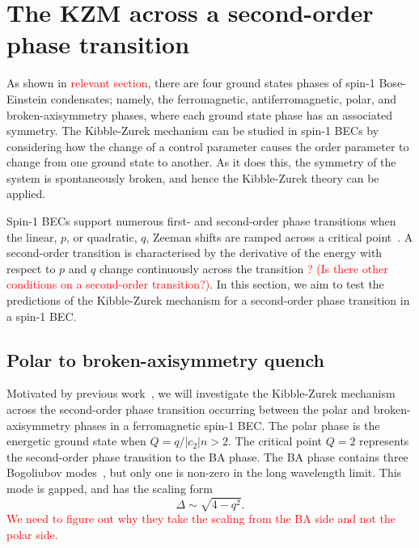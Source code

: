 \section{The KZM across a second-order phase transition}
As shown in \textcolor{red}{relevant section}, there are four ground states
phases of spin-1 Bose-Einstein condensates; namely, the ferromagnetic,
antiferromagnetic, polar, and broken-axisymmetry phases, where each ground
state phase has an associated symmetry.
The Kibble-Zurek mechanism can be studied in spin-1 BECs by considering how
the change of a control parameter causes the order parameter to change from 
one ground state to another.
As it does this, the symmetry of the system is spontaneously broken, and hence
the Kibble-Zurek theory can be applied.

Spin-1 BECs support numerous first- and second-order phase transitions
when the linear, $p$, or quadratic, $q$, Zeeman shifts are
ramped across a critical point~\cite{Kawaguchi2012}.
A second-order transition is characterised by the derivative of the energy with
respect to $p$ and $q$ change continuously across the transition
\textcolor{red}{? (Is there other conditions on a second-order transition?)}.
In this section, we aim to test the predictions of the Kibble-Zurek mechanism
for a second-order phase transition in a spin-1 BEC.

\subsection{Polar to broken-axisymmetry quench}
Motivated by previous work~\cite{Damski2007}, we will investigate the
Kibble-Zurek mechanism across the second-order phase transition occurring
between the polar and broken-axisymmetry phases in a ferromagnetic spin-1 BEC.
The polar phase is the energetic ground state when $Q=q/|c_2|n > 2$.
The critical point $Q=2$ represents the second-order phase transition to the
BA phase.
The BA phase contains three Bogoliubov modes~\cite{Uchino2010}, but only one
is non-zero in the long wavelength limit.
This mode is gapped, and has the scaling form
\begin{equation}
    \Delta \sim \sqrt{4 - q^2}.
\end{equation}
\textcolor{red}{We need to figure out why they take the scaling from the BA side
and not the polar side.}

